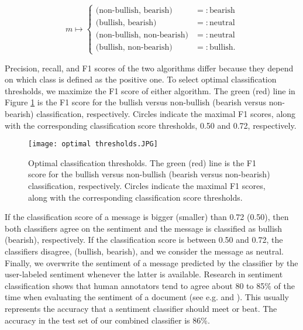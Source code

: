 \[ m\mapsto \begin{cases} \text{(non-bullish, bearish)} & =: \text{bearish} \\ \text{(bullish, bearish)}& =: \text{neutral} \\ \text{(non-bullish, non-bearish)}& =: \text{neutral} \\ \text{(bullish, non-bearish)} &=: \text{bullish.} \end{cases}\] 

Precision, recall, and F1 scores of the two algorithms differ because they depend on which class is defined as the positive one. To select optimal classification thresholds, we maximize the F1 score of either algorithm. The green (red) line in Figure \ref{fig:optimal_thresholds} is the F1 score for the bullish versus non-bullish (bearish versus non-bearish) classification, respectively. Circles indicate the maximal F1 scores, along with the corresponding classification score thresholds, 0.50 and 0.72, respectively. 

\begin{figure}[h]
    \centering
    \texttt{[image: optimal thresholds.JPG]}
    \caption{Optimal classification thresholds. The green (red) line is the F1 score for the bullish versus non-bullish (bearish versus non-bearish) classification, respectively. Circles indicate the maximal F1 scores, along with the corresponding classification score thresholds.}
    \label{fig:optimal_thresholds}
\end{figure}


If the classification score of a message is bigger (smaller) than 0.72 (0.50), then both classifiers agree on the sentiment and the message is classified as bullish (bearish), respectively. If the classification score is between 0.50 and 0.72, the classifiers disagree, (bullish, bearish), and we consider the message as neutral. Finally, we overwrite the sentiment of a message predicted by the classifier by the user-labeled sentiment whenever the latter is available. Research in sentiment classification shows that human annotators tend to agree about 80 to 85\% of the time when evaluating the sentiment of a document (see e.g. \citet{wilson2005recognizing} and \citet{chen2020large}). This usually represents the accuracy that a sentiment classifier should meet or beat. The accuracy in the test set of our combined classifier is 86\%.


